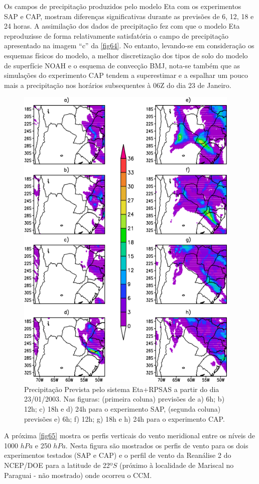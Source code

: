 Os campos de precipitação produzidos pelo modelo Eta com os experimentos SAP e CAP, mostram diferenças significativas durante as previsões de 6, 12, 18 e 24 horas. A assimilação dos dados de precipitação fez com que o modelo Eta reproduzisse de forma relativamente satisfatória o campo de precipitação apresentado na imagem ``c'' da \autoref{fig64}. No entanto, levando-se em consideração os esquemas físicos do modelo,  a melhor discretização dos tipos de solo do modelo de superfície NOAH e o esquema de convecção BMJ, nota-se também que as simulações do experimento CAP tendem a superestimar e a espalhar um pouco mais a precipitação nos horários subsequentes à 06Z do dia 23 de Janeiro.

\begin{figure}[!hpb]
\centering
\includegraphics[height=15cm]{./figs/prec_eta1.png}
\caption{Precipitação Prevista pelo sistema Eta+RPSAS a partir do dia 23/01/2003. Nas figuras: (primeira coluna) previsões de a) 6h; b) 12h; c) 18h e d) 24h para o experimento SAP, (segunda coluna) previsões e) 6h; f) 12h; g) 18h e h) 24h para o experimento CAP.}
\label{fig64}
\end{figure}

A próxima \autoref{fig65} mostra os perfis verticais do vento meridional entre os níveis de 1000 $hPa$ e 250 $hPa$. Nesta figura são mostrados os perfis de vento para os dois experimentos testados (SAP e CAP) e o perfil de vento da Reanálise 2 do NCEP/DOE para a latitude de 22$ºS$ (próximo à localidade de Mariscal no Paraguai - não mostrado) onde ocorreu o CCM. 

